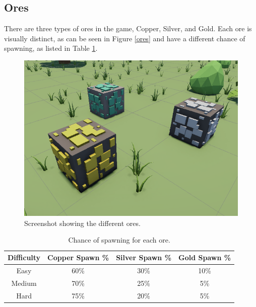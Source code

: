 \begin{spacing}{2.0}
	\subsection{Ores}

	There are three types of ores in the game, Copper, Silver, and Gold. Each ore is visually distinct, as can be seen in Figure \ref{ores} and have a different chance of spawning, as listed in Table \ref{ore_chance_table}.

	\begin{figure}[ht]
		\centering
		\includegraphics[width=5in, fbox]{Figures/Ores.png}
		\caption{Screenshot showing the different ores.}
		\label{fig:ores}
	\end{figure}

	\begin{table}[ht]
		\centering
		\renewcommand{\arraystretch}{1.2} %
		\setlength{\tabcolsep}{8pt} %
		\begin{tabular}{|c|c|c|c|}
			\hline
			\textbf{Difficulty} & \textbf{Copper Spawn \%} & \textbf{Silver Spawn \%} & \textbf{Gold Spawn \%} \\
			\hline
			Easy                & 60\%                     & 30\%                     & 10\%                   \\
			\hline
			Medium              & 70\%                     & 25\%                     & 5\%                    \\
			\hline
			Hard                & 75\%                     & 20\%                     & 5\%                    \\
			\hline
		\end{tabular}
		\caption{Chance of spawning for each ore.}
		\label{ore_chance_table}
	\end{table}


\end{spacing}
